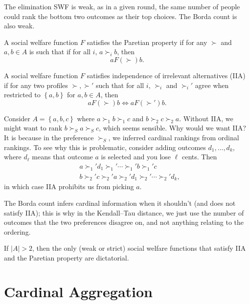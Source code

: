 The elimination SWF is weak, as in a given round, the same number of people could rank the bottom two outcomes as their top choices. The Borda count is also weak.

\begin{definition}
	A social welfare function $F$ satisfies the Paretian property if for any $\succ $ and $a,b \in A$ is such that if for all $i$, $a \succ_i b$, then \[
		a F(\succ) b
	.\] 
\end{definition}
\begin{definition}
	A social welfare function $F$ satisfies independence of irrelevant alternatives (IIA) if for any two profiles $\succ,\succ'$ such that for all $i$, $\succ_i$ and $\succ_i'$ agree when restricted to $\left\{a,b\right\}$ for $a,b \in A$, then \[
		a F(\succ) b \iff a F(\succ') b
	.\] 
\end{definition}
	
\begin{example}
	Consider $A = \left\{a,b,c\right\}$ where $a \succ_1 b \succ_1 c$ and $b \succ_2 c \succ_2 a$. Without IIA, we might want to rank $b \succ_{S} a \succ_S c$, which seems sensible. Why would we want IIA? It is because in the preference $\succ_S$, we inferred cardinal rankings from ordinal rankings. To see why this is problematic, consider adding outcomes $d_1,\ldots,d_k$, where $d_\ell$ means that outcome $a$ is selected and you lose $\ell$ cents. Then
	\begin{align*}
		&a \succ_1' d_1 \succ_1' \cdots \succ_1' b \succ_1' c \\
		& b \succ_2' c \succ_2' a \succ_2' d_1 \succ_2' \cdots \succ_2' d_k
	,\end{align*}
	in which case IIA prohibits us from picking $a$.
\end{example}

The Borda count infers cardinal information when it shouldn't (and does not satisfy IIA); this is why in the Kendall--Tau distance, we just use the number of outcomes that the two preferences disagree on, and not anything relating to the ordering.

\begin{theorem}
	If $\left| A \right| > 2$, then the only (weak or strict) social welfare functions that satisfy IIA and the Paretian property are dictatorial.
\end{theorem}

\section{Cardinal Aggregation}

